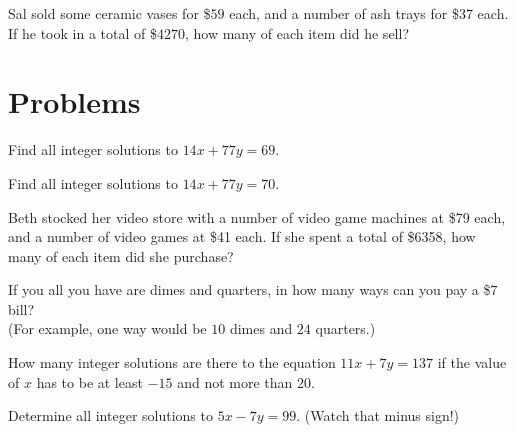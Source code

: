 \begin{exer}
Sal sold some ceramic vases for \$$59$ each, and a number of ash trays for \$$37$ each.
If he took in a total of \$$4270$, how many of each item did he sell? 
\end{exer}


\section{Problems}

\begin{prob}
Find all integer solutions to $14x+ 77y = 69$.
\end{prob}

\begin{prob}
Find all integer solutions to $14x+ 77y = 70$.
\end{prob}

\begin{prob}
Beth stocked her video store with a number of video game 
machines at \$79 each, and a number of video games at \$41 each.
If she spent a total of \$6358, how many of each item did she purchase?
\end{prob}

\begin{prob}
If you all you have are dimes and quarters, in how many ways can you pay a \$$7$ bill?\\
 (For example, one way would be $10$  dimes and $24$ quarters.)
\end{prob}
 
\begin{prob}
How many integer solutions are there to the equation $11x  + 7y = 137$ if the value of $x$
has to be at least $-15$ and not more than $20$. 
\end{prob}

\begin{prob}
Determine all integer solutions to $5x - 7y = 99$. (Watch that minus sign!)
\end{prob}

